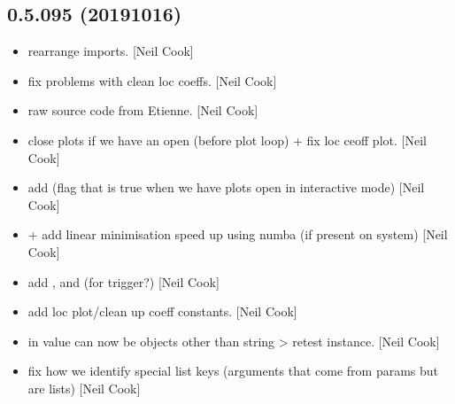 \documentclass[a4paper,10pt,english]{report}
\begin{document}
\subsection{0.5.095 (2019\sphinxhyphen{}10\sphinxhyphen{}16)}
\label{\detokenize{misc/changelog:id67}}\begin{itemize}
\item {} 
 \sphinxhyphen{} rearrange imports. {[}Neil Cook{]}

\item {} 
 \sphinxhyphen{} fix problems with clean loc coeffs.
{[}Neil Cook{]}

\item {} 
 \sphinxhyphen{} raw source code from Etienne. {[}Neil Cook{]}

\item {} 
 \sphinxhyphen{} close plots if we have an open (before
plot loop) + fix loc ceoff plot. {[}Neil Cook{]}

\item {} 
 \sphinxhyphen{} add  (flag that is true when we have
plots open in interactive mode) {[}Neil Cook{]}

\item {} 
 +  \sphinxhyphen{} add linear minimisation speed up
using numba (if present on system) {[}Neil Cook{]}

\item {} 
 \sphinxhyphen{} add ,
 and  (for trigger?) {[}Neil Cook{]}

\item {} 
 \sphinxhyphen{} add loc plot/clean up coeff
constants. {[}Neil Cook{]}

\item {} 
 \sphinxhyphen{} in  value can now be objects other
than string \textendash{}\textgreater{} re\sphinxhyphen{}test instance. {[}Neil Cook{]}

\item {} 
 \sphinxhyphen{} fix how we identify special list keys
(arguments that come from params but are lists) {[}Neil Cook{]}


\end{itemize}
\end{document}
